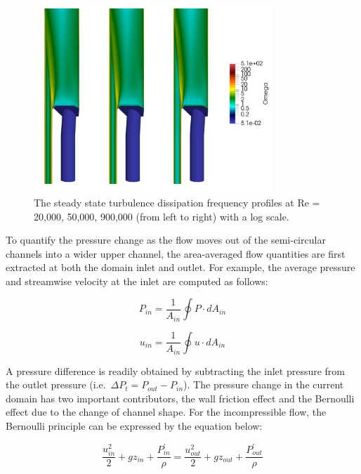 \begin{figure}[!ht]
\centering
\includegraphics[width=0.8\textwidth]{./figures/reflector_omega.png}
\caption{The steady state turbulence dissipation frequency profiles at Re = 20,000, 50,000, 900,000 (from left to right) with a log scale. }
\label{fig:reflector_omega}
\end{figure}

To quantify the pressure change as the flow moves out of the semi-circular channels into a wider upper channel, the area-averaged flow quantities are first extracted at both the domain inlet and outlet.
For example, the average pressure and streamwise velocity at the inlet are computed as follows: 

\begin{equation}
    P_{in} = \frac{1}{A_{in}} \oint P \cdot dA_{in}
\end{equation}

\begin{equation}
    u_{in} = \frac{1}{A_{in}} \oint u \cdot dA_{in}
\end{equation}

A pressure difference is readily obtained by subtracting the inlet pressure from the outlet pressure (i.e.\ $\Delta P_t = P_{out} - P_{in}$).
The pressure change in the current domain has two important contributors, the wall friction effect and the Bernoulli effect due to the change of channel shape.
For the incompressible flow, the Bernoulli principle can be expressed by the equation below: 

\begin{equation}
    \frac{u_{in}^2}{2} + gz_{in} + \frac{P^\prime_{in}}{\rho} = \frac{u_{out}^2}{2} + gz_{out} + \frac{P^\prime_{out}}{\rho}
\end{equation}


